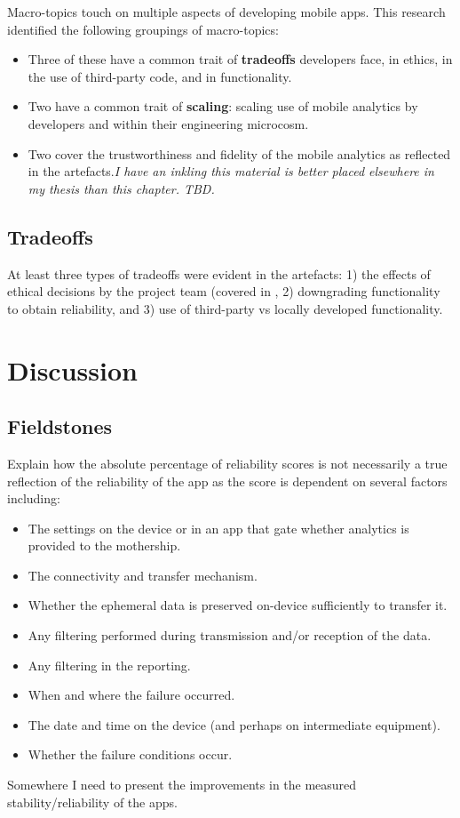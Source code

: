 Macro-topics touch on multiple aspects of developing mobile apps. This research identified the following groupings of macro-topics:

\begin{itemize}
    \item Three of these have a common trait of \textbf{tradeoffs} developers face, in ethics, in the use of third-party code, and in functionality.
    \item Two have a common trait of \textbf{scaling}: scaling use of mobile analytics by developers and within their engineering microcosm.
    \item Two cover the trustworthiness and fidelity of the mobile analytics as reflected in the artefacts.\emph{I have an inkling this material is better placed elsewhere in my thesis than this chapter. TBD.} 
\end{itemize}

\subsection{Tradeoffs}
At least three types of tradeoffs were evident in the artefacts: 1) the effects of ethical decisions by the project team (covered in , 2) downgrading functionality to obtain reliability, and 3) use of third-party vs locally developed functionality.

\section{Discussion}

\subsection{Fieldstones}
Explain how the absolute percentage of reliability scores is not necessarily a true reflection of the reliability of the app as the score is dependent on several factors including:

\begin{itemize}
    \item The settings on the device or in an app that gate whether analytics is provided to the mothership.
    \item The connectivity and transfer mechanism.
    \item Whether the ephemeral data is preserved on-device sufficiently to transfer it.
    \item Any filtering performed during transmission and/or reception of the data.
    \item Any filtering in the reporting.
    \item When and where the failure occurred.
    \item The date and time on the device (and perhaps on intermediate equipment).
    \item Whether the failure conditions occur.
\end{itemize}

Somewhere I need to present the improvements in the measured stability/reliability of the apps.
